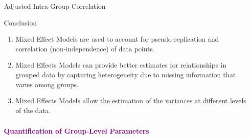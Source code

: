 \documentclass{beamer}
\begin{document}
\begin{frame}{Adjusted Intra-Group Correlation}
\end{frame}

\begin{frame}{Conclusion}
  \begin{enumerate}
      \item Mixed Effect Models are used to account for pseudo-replication and correlation (non-independence) of data points.
      \item Mixed Effects Models can provide better estimates for relationships in grouped data by capturing heterogeneity due to missing information that varies among groups.
      \item Mixed Effects Models allow the estimation of the variances at different levels of the data.
    \end{enumerate}
\end{frame}


\begin{frame}
  \frametitle{}
  \begin{center}
    \huge\textbf{\textcolor{purple}{Quantification of Group-Level Parameters}}
  \end{center}
\end{frame}
\end{document}
